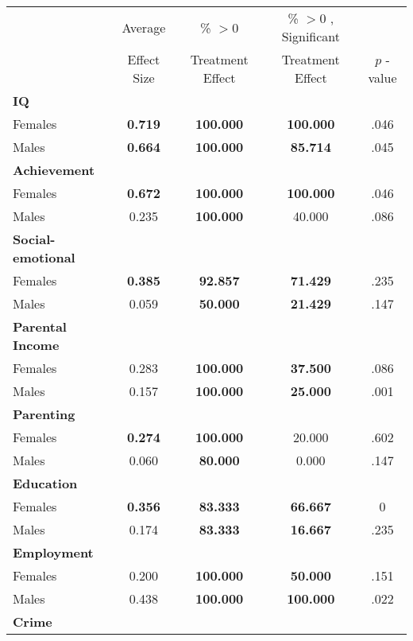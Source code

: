 \begin{tabular}{l c c c c}
\toprule
 & Average & \% $ >0 $ & \% $ >0 $ , Significant & \citet{Rosenbaum_2005_Distribution_JRSS} \\
 & Effect Size & Treatment Effect & Treatment Effect & $ p $ -value \\
\midrule
\textbf{IQ} & & & & \\
\quad Females &  \textbf{    0.719} & \textbf{  100.000} & \textbf{  100.000} & .046 \\
\quad Males &  \textbf{    0.664} & \textbf{  100.000} & \textbf{   85.714} & .045 \\
\midrule
\textbf{Achievement} & & & & \\
\quad Females &  \textbf{    0.672} & \textbf{  100.000} & \textbf{  100.000} & .046 \\
\quad Males &      0.235 & \textbf{  100.000} &    40.000 & .086 \\
\midrule
\textbf{Social-emotional} & & & & \\
\quad Females &  \textbf{    0.385} & \textbf{   92.857} & \textbf{   71.429} & .235 \\
\quad Males &      0.059 & \textbf{   50.000} & \textbf{   21.429} & .147 \\
\midrule
\textbf{Parental Income} & & & & \\
\quad Females &      0.283 & \textbf{  100.000} & \textbf{   37.500} & .086 \\
\quad Males &      0.157 & \textbf{  100.000} & \textbf{   25.000} & .001 \\
\midrule
\textbf{Parenting} & & & & \\
\quad Females &  \textbf{    0.274} & \textbf{  100.000} &    20.000 & .602 \\
\quad Males &      0.060 & \textbf{   80.000} &     0.000 & .147 \\
\midrule
\textbf{Education} & & & & \\
\quad Females &  \textbf{    0.356} & \textbf{   83.333} & \textbf{   66.667} & 0 \\
\quad Males &      0.174 & \textbf{   83.333} & \textbf{   16.667} & .235 \\
\midrule
\textbf{Employment} & & & & \\
\quad Females &      0.200 & \textbf{  100.000} & \textbf{   50.000} & .151 \\
\quad Males &      0.438 & \textbf{  100.000} & \textbf{  100.000} & .022 \\
\midrule
\textbf{Crime} & & & & \\

\end{tabular}
